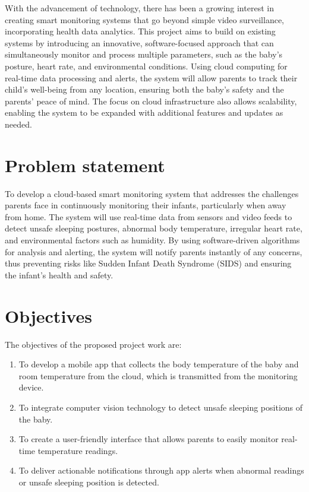 \documentclass[12pt,a4paper]{report}
\begin{document}
With the advancement of technology, there has been a growing interest in creating smart monitoring systems that go beyond simple video surveillance, incorporating health data analytics. This project aims to build on existing systems by introducing an innovative, software-focused approach that can simultaneously monitor and process multiple parameters, such as the baby’s posture, heart rate, and environmental conditions. Using cloud computing for real-time data processing and alerts, the system will allow parents to track their child’s well-being from any location, ensuring both the baby’s safety and the parents’ peace of mind. The focus on cloud infrastructure also allows scalability, enabling the system to be expanded with additional features and updates as needed.

\section{Problem statement }
To develop a cloud-based smart monitoring system that addresses the challenges parents face in continuously monitoring their infants, particularly when away from home. The system will use real-time data from sensors and video feeds to detect unsafe sleeping postures, abnormal body temperature, irregular heart rate, and environmental factors such as humidity. By using software-driven algorithms for analysis and alerting, the system will notify parents instantly of any concerns, thus preventing risks like Sudden Infant Death Syndrome (SIDS) and ensuring the infant's health and safety.
\section{Objectives}
The objectives of the proposed project work are:
\begin{enumerate}
    \item To develop a mobile app that collects the body temperature of the baby and room temperature from the cloud, which is transmitted from the monitoring device.
    \item To integrate computer vision technology to detect unsafe sleeping positions of the baby.
    \item To create a user-friendly interface that allows parents to easily monitor real-time temperature readings.
    \item To deliver actionable notifications through app alerts when abnormal readings or unsafe sleeping position is detected.
\end{enumerate}
\end{document}
